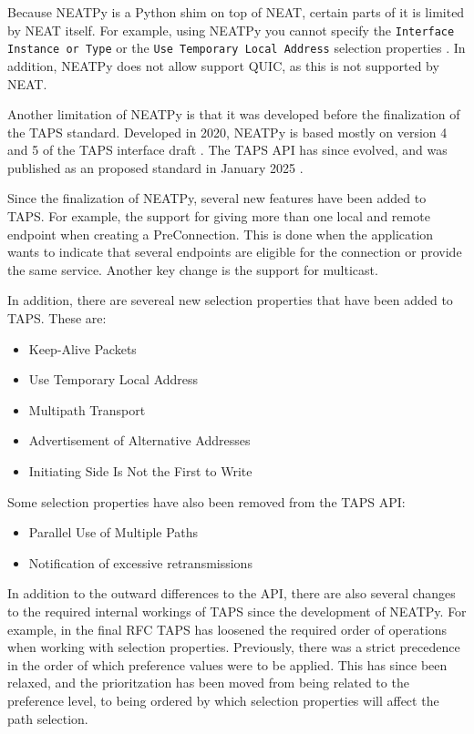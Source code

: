 Because NEATPy is a Python shim on top of NEAT, certain parts of it is
limited by NEAT itself. For example,
using NEATPy you cannot specify the \texttt{Interface Instance or Type}
or the \texttt{Use Temporary Local Address} selection properties 
\cite{NEATPyDocumentationNEATPy}. In addition, NEATPy does not
allow support QUIC, as this is not supported by NEAT. 

Another
limitation of NEATPy is that it was developed before the finalization of
the TAPS standard. Developed in 2020, NEATPy is based mostly on
version 4 and 5 of the TAPS interface draft \cite[p. 109]{gundersenNEATPyStandardsConformantProtocolIndependent2020}.
The TAPS API has since evolved, and was 
published as an proposed standard in January 2025
\cite{trammellAbstractApplicationProgramming2025}.

Since the finalization of NEATPy, several new features have been added
to TAPS.
For example, the support for giving more than one local and remote
endpoint when creating a PreConnection. This is done when the application
wants to indicate that several endpoints are eligible for the connection
or provide the same service. Another key change is the support for
multicast.

In addition, there are severeal new selection properties that have been added
to TAPS. These are:
\begin{itemize}
    \item Keep-Alive Packets
    \item Use Temporary Local Address
    \item Multipath Transport
    \item Advertisement of Alternative Addresses
    \item Initiating Side Is Not the First to Write
\end{itemize}

Some selection properties have also been removed from the TAPS API:
\begin{itemize}
    \item Parallel Use of Multiple Paths
    \item Notification of excessive retransmissions
\end{itemize}

In addition to the outward differences to the API, there are also several
changes to the required internal workings of TAPS since the development of NEATPy.
For example, in the final RFC TAPS has loosened the required
order of operations when working with selection properties.
Previously, there was a strict precedence in the order of
which preference values were to be applied. This has since been
relaxed, and the prioritzation has been moved from being
related to the preference level, to being ordered by which
selection properties will affect the path selection.

